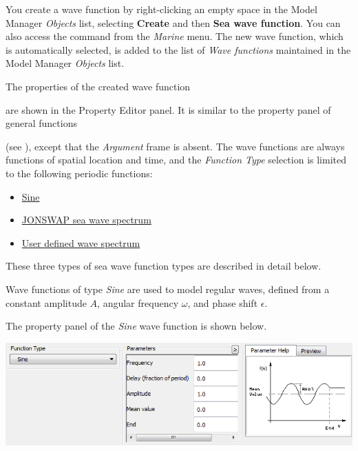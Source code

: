 You create a wave function by right-clicking an empty space in the Model Manager
{\sl Objects} list, selecting \textbf{Create} and then
\textbf{Sea wave function}.
You can also access the command from the {\sl Marine} menu.
The new wave function, which is automatically selected,
is added to the list of {\sl Wave functions} maintained in the Model Manager
{\sl Objects} list.

The properties of the created wave function
\noindent\begin{minipage}{0.65\textwidth}\raggedright
are shown in the Property Editor panel.
It is similar to the property panel of general functions
\end{minipage}

\vskip-2pt\noindent (see ),
except that the {\sl Argument} frame is absent.
The wave functions are always functions of spatial location and time, and the
{\sl Function Type} selection is limited to the following periodic functions:

\begin{itemize}
\item\protect\hyperlink{sine-wave}{Sine}
\item\protect\hyperlink{jonswap-sea-wave-spectrum}{JONSWAP sea wave spectrum}
\item\protect\hyperlink{user-defined-wave-spectrum}{User defined wave spectrum}
\end{itemize}

These three types of sea wave function types are described in detail below.

\clearpage


Wave functions of type {\sl Sine} are used to model regular waves, defined from
a constant amplitude $A$, angular frequency $\omega$,
and phase shift $\epsilon$.

The property panel of the {\sl Sine} wave function is shown below.

\noindent\includegraphics[width=\textwidth]{Figures/4a-SineFunction}

